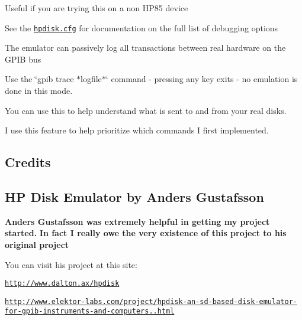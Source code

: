 \begin{DoxyItemize}
\begin{DoxyItemize}
\begin{DoxyItemize}
\begin{DoxyItemize}
\item Useful if you are trying this on a non H\+P85 device
\item See the \href{sdcard/hpdisk.cfg}{\tt hpdisk.\+cfg} for documentation on the full list of debugging options
\end{DoxyItemize}
\item The emulator can passively log all transactions between real hardware on the G\+P\+IB bus
\begin{DoxyItemize}
\item Use the \char`\"{}gpib trace $\ast$logfile$\ast$\char`\"{} command -\/ pressing any key exits -\/ no emulation is done in this mode.
\item You can use this to help understand what is sent to and from your real disks.
\item I use this feature to help prioritize which commands I first implemented. 


\end{DoxyItemize}
\end{DoxyItemize}
\end{DoxyItemize}
\end{DoxyItemize}

\subsection*{Credits}

\subsection*{HP Disk Emulator by Anders Gustafsson}

{\bfseries Anders Gustafsson was extremely helpful in getting my project started.} {\bfseries In fact I really owe the very existence of this project to his original project}
\begin{DoxyItemize}
\item You can visit his project at this site\+:
\begin{DoxyItemize}
\item \href{http://www.dalton.ax/hpdisk}{\tt http\+://www.\+dalton.\+ax/hpdisk}
\item \href{http://www.elektor-labs.com/project/hpdisk-an-sd-based-disk-emulator-for-gpib-instruments-and-computers.13693.html}{\tt http\+://www.\+elektor-\/labs.\+com/project/hpdisk-\/an-\/sd-\/based-\/disk-\/emulator-\/for-\/gpib-\/instruments-\/and-\/computers..\+html}
\end{DoxyItemize}
\end{DoxyItemize}

